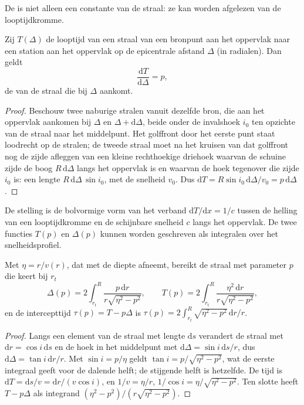 De  is niet alleen een constante van de straal: ze kan worden afgelezen
van de looptijdkromme.

\begin{theorem}\label{thm:b3:seismology-imaging:benndorf}
Zij $T(\Delta)$ de looptijd van een straal van een bronpunt aan het oppervlak naar een
station aan het oppervlak op de epicentrale afstand $\Delta$ (in radialen). Dan geldt
\[
  \frac{\mathrm dT}{\mathrm d\Delta} = p ,
\]
de  van de straal die bij $\Delta$ aankomt.
\end{theorem}

\begin{proof}
Beschouw twee naburige stralen vanuit dezelfde bron, die aan het oppervlak aankomen
bij $\Delta$ en $\Delta + \mathrm d\Delta$, beide onder de invalshoek $i_0$ ten opzichte
van de straal naar het middelpunt. Het golffront door het eerste punt staat loodrecht
op de stralen; de tweede straal moet na het kruisen van dat golffront nog de zijde
afleggen van een kleine rechthoekige driehoek waarvan de schuine zijde de boog
$R\,\mathrm d\Delta$ langs het oppervlak is en waarvan de hoek tegenover die zijde
$i_0$ is: een lengte $R\,\mathrm d\Delta\,\sin i_0$, met de snelheid $v_0$. Dus
$\mathrm dT = R\sin i_0\,\mathrm d\Delta/v_0 = p\,\mathrm d\Delta$.
\end{proof}

De stelling is de bolvormige vorm van het verband $\mathrm dT/\mathrm dx = 1/c$
tussen de helling van een looptijdkromme en de schijnbare snelheid $c$ langs het
oppervlak. De twee functies $T(p)$ en $\Delta(p)$ kunnen worden geschreven als integralen
over het snelheidsprofiel.

\begin{proposition}\label{prop:b3:seismology-imaging:integrals}
Met $\eta = r/v(r)$, dat met de diepte afneemt, bereikt de straal met parameter $p$ die
keert bij $r_t$
\[
  \Delta(p) = 2\int_{r_t}^{R}\frac{p\,\mathrm dr}{r\sqrt{\eta^2 - p^2}},
  \qquad
  T(p) = 2\int_{r_t}^{R}\frac{\eta^2\,\mathrm dr}{r\sqrt{\eta^2 - p^2}},
\]
en de intercepttijd $\tau(p) = T - p\Delta$ is
$\tau(p) = 2\int_{r_t}^{R}\sqrt{\eta^2 - p^2}\,\mathrm dr/r$.
\end{proposition}

\begin{proof}
Langs een element van de straal met lengte $\mathrm ds$ verandert de straal met
$\mathrm dr = \cos i\,\mathrm ds$ en de hoek in het middelpunt met
$\mathrm d\Delta = \sin i\,\mathrm ds/r$, dus $\mathrm d\Delta = \tan i\,\mathrm dr/r$.
Met $\sin i = p/\eta$ geldt $\tan i = p/\sqrt{\eta^2 - p^2}$, wat de eerste integraal
geeft voor de dalende helft; de stijgende helft is hetzelfde. De tijd is
$\mathrm dT = \mathrm ds/v = \mathrm dr/(v\cos i)$, en $1/v = \eta/r$,
$1/\cos i = \eta/\sqrt{\eta^2 - p^2}$. Ten slotte heeft $T - p\Delta$ als integrand
$(\eta^2 - p^2)/(r\sqrt{\eta^2 - p^2})$.
\end{proof}

